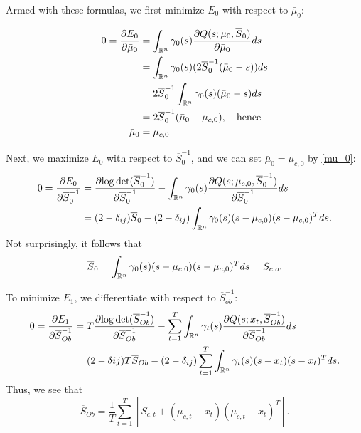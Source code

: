 \documentclass[12pt,leqno]{article}
\begin{document}
Armed with these formulas, we first minimize $E_0$ with respect to $\bar{\mu}_0$: 
 
\begin{align}
0 = \frac{\partial{E_0}}{\partial{\bar{\mu}_0}} &= \int_{{\mathbb R}^n}\gamma_0(s)\frac{\partial{Q(s;\bar{\mu}_0,\overline{S}_0)}}{\partial{\bar{\mu}_0}}ds \notag\\
&= \int_{{\mathbb R}^n}\gamma_0(s)(2\overline{S}_0^{-1}(\bar{\mu}_0-s))ds\notag\\
&= 2\overline{S}_0^{-1}\int_{{\mathbb R}^n}\gamma_0(s)(\bar{\mu}_0-s)ds \notag\\
&= 2\overline{S}_0^{-1}(\bar{\mu}_0-\mu_{c,0}), \quad\text{hence}\notag\\
\bar{\mu}_0 &= \mu_{c,0}\label{mu_0}
\end{align}

Next, we maximize $E_0$ with respect to $\overline{S}_0^{-1}$, and we can set $\bar{\mu}_0 = \mu_{c,0}$ by \eqref{mu_0}:
\begin{align*}
0 = \frac{\partial{E_0}}{\partial{\overline{S}_0^{-1}}} &= \frac{\partial{\log\det(\overline{S}_0^{-1})}}{\partial\overline{S}_0^{-1}} - \int_{{\mathbb R}^n}\gamma_0(s)\frac{\partial{Q(s;\mu_{c,0},\overline{S}_0^{-1})}}{\partial{\overline{S}_0^{-1}}}ds \\
&= (2-\delta_{ij})\overline{S}_0 - (2-\delta_{ij})\int_{{\mathbb R}^n}\gamma_0(s)(s-\mu_{c,0})(s-\mu_{c,0})^Tds.
\end{align*}
Not surprisingly, it follows that
\begin{equation}\label{Sigma_0}
  \overline{S}_0 = \int_{{\mathbb R}^n}\gamma_0(s)(s-\mu_{c,0})(s-\mu_{c,0})^Tds = S_{c,o}.
  \end{equation}

To minimize $E_1$, we differentiate with respect to $\overline{S}_{ob}^{-1}$:
\begin{align*}
  0 = \frac{\partial{E_1}}{\partial{\overline{S}_{Ob}^{-1}}} &= T\frac{\partial{\log\det(\overline{S}_{Ob}^{-1})}}{\partial\overline{S}_{Ob}^{-1}}
  - \sum_{t=1}^T\int_{{\mathbb R}^n}\gamma_t(s)\frac{\partial{Q(s;x_t,\overline{S}_{Ob}^{-1})}}{\partial{\overline{S}_{Ob}^{-1}}}ds \\
  &= (2-\delta{ij})T\overline{S}_{Ob} - (2-\delta_{ij})\sum_{t=1}^T\int_{{\mathbb R}^n}\gamma_t(s)(s-x_t)(s-x_t)^Tds.
\end{align*}
Thus,  we see that
\begin{equation}\label{Sigma_Ob}
  \overline{S}_{Ob} = \frac{1}{T}\sum_{t=1}^T [S_{c,t} + (\mu_{c,t}-x_t)(\mu_{c,t}-x_t)^T].
\end{equation}
\end{document}
